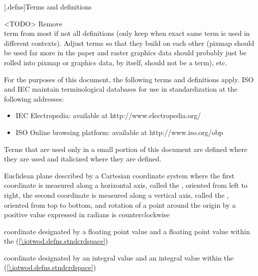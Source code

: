 
[\iotwod.defns]{Terms and definitions}

\pnum
<TODO> Remove \\term from most if not all definitions (only keep when exact same term is used in different contexts). Adjust terms so that they build on each other (pixmap should be used far more in the paper and raster graphics data should probably just be rolled into pixmap or graphics data, by itself, should not be a term), etc.

%
For the purposes of this document, the following terms and definitions apply.
ISO and IEC maintain terminological databases for use in standardization at the following addresses:
\begin{itemize}
\renewcommand{\labelitemi}{$\bullet$} %
\item IEC Electropedia: available at http://www.electropedia.org/
\item ISO Online browsing platform: available at http://www.iso.org/obp
\end{itemize}

\pnum
Terms that are used only in a small portion of this document are defined where they are used and italicized where they are defined.


%
Euclidean plane described by a Cartesian coordinate system where the first coordinate is measured along a horizontal axis, called the \xaxis, oriented from left to right, the second coordinate is measured along a vertical axis, called the \yaxis, oriented from top to bottom, and rotation of a point around the origin by a positive value expressed in radians is counterclockwise

%
 coordinate designated by a floating point \xaxis{} value and a floating point \yaxis{} value within the  (\ref{\iotwod.defns.stndcrdspace})

%
 coordinate designated by an integral \xaxis{} value and an integral \yaxis{} value within the  (\ref{\iotwod.defns.stndcrdspace})

